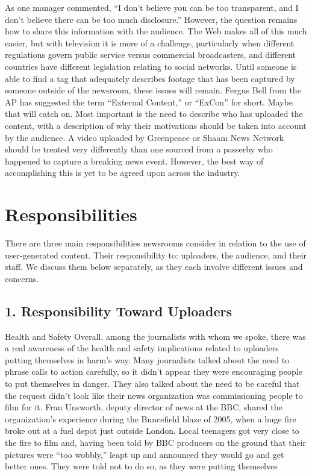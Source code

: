 \documentclass[symmetric, notoc, nobib]{towcenter-book}
\begin{document}
As one manager commented, ``I don't believe you can be too transparent,
and I don't believe there can be too much disclosure.'' However, the question
remains how to share this information with the audience. The Web makes
all of this much easier, but with television it is more of a challenge, particularly
when different regulations govern public service versus commercial
broadcasters, and different countries have different legislation relating to
social networks. Until someone is able to find a tag that adequately describes
footage that has been captured by someone outside of the newsroom, these
issues will remain. Fergus Bell from the AP has suggested the term ``External
Content,'' or ``ExCon'' for short. Maybe that will catch on.
Most important is the need to describe who has uploaded the content, with
a description of why their motivations should be taken into account by the
audience. A video uploaded by Greenpeace or Shaam News Network should
be treated very differently than one sourced from a passerby who happened
to capture a breaking news event. However, the best way of accomplishing
this is yet to be agreed upon across the industry.

\chapter{Responsibilities}
There are three main responsibilities newsrooms consider in relation to the
use of user-generated content. Their responsibility to: uploaders, the audience,
and their staff. We discuss them below separately, as they each involve
different issues and concerns.
\section{1. Responsibility Toward Uploaders}
Health and Safety
Overall, among the journalists with whom we spoke, there was a real awareness
of the health and safety implications related to uploaders putting themselves
in harm's way. Many journalists talked about the need to phrase calls
to action carefully, so it didn't appear they were encouraging people to put
themselves in danger. They also talked about the need to be careful that the
request didn't look like their news organization was commissioning people
to film for it.
Fran Unsworth, deputy director of news at the BBC, shared the organization's
experience during the Buncefield blaze of 2005, when a huge fire broke
out at a fuel depot just outside London. Local teenagers got very close to the
fire to film and, having been told by BBC producers on the ground that their
pictures were ``too wobbly,'' leapt up and announced they would go and get
better ones. They were told not to do so, as they were putting themselves
\end{document}
